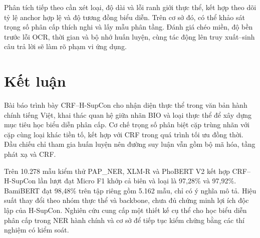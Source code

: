 \documentclass[conference,a4paper]{IEEEtran}
\begin{document}
Phân tích tiếp theo cần xét loại, độ dài và lỗi ranh giới thực thể, kết
hợp theo dõi tỷ lệ anchor hợp lệ và độ tương đồng biểu diễn. Trên cơ sở
đó, có thể khảo sát trọng số phân cấp thích nghi và lấy mẫu phân tầng.
Đánh giá chéo miền, độ bền trước lỗi OCR, thời gian và bộ nhớ huấn luyện,
cùng tác động lên truy xuất--sinh câu trả lời sẽ làm rõ phạm vi ứng dụng.

\section{Kết luận}\label{sec:conclusion}

Bài báo trình bày CRF--H-SupCon cho nhận diện thực thể trong văn bản hành
chính tiếng Việt, khai thác quan hệ giữa nhãn BIO và loại thực thể để
xây dựng mục tiêu học biểu diễn phân cấp. Cơ chế trọng số phân biệt cặp
trùng nhãn với cặp cùng loại khác tiền tố, kết hợp với CRF trong quá
trình tối ưu đồng thời. Đầu chiếu chỉ tham gia huấn luyện nên đường suy
luận vẫn gồm bộ mã hóa, tầng phát xạ và CRF.

Trên 10.278 mẫu kiểm thử PAP\_NER, XLM-R và PhoBERT V2 kết hợp
CRF--H-SupCon lần lượt đạt Micro F1 khớp cả biên và loại là 97,28\% và
97,92\%. BamiBERT đạt 98,48\% trên tập riêng gồm 5.162 mẫu, chỉ có ý
nghĩa mô tả. Hiệu suất thay đổi theo nhóm thực thể và backbone, chưa
đủ chứng minh lợi ích độc lập của H-SupCon. Nghiên cứu cung cấp một
thiết kế cụ thể cho học biểu diễn phân cấp trong NER hành chính và
cơ sở để tiếp tục kiểm chứng bằng các thí nghiệm có kiểm soát.
\end{document}
